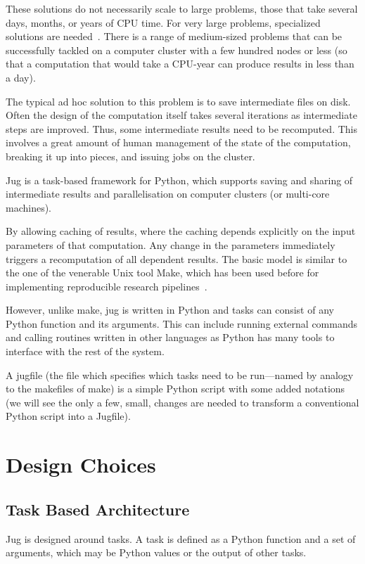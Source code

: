 \documentclass{article}
\begin{document}
These solutions do not necessarily scale to large problems, those that take
several days, months, or years of CPU time. For very large problems,
specialized solutions are needed~\citep{mapReduce}. There is a range of
medium-sized problems that can be successfully tackled on a computer cluster
with a few hundred nodes or less (so that a computation that would take a
CPU-year can produce results in less than a day).

The typical ad hoc solution to this problem is to save intermediate files on
disk. Often the design of the computation itself takes several iterations as
intermediate steps are improved. Thus, some intermediate results need to be
recomputed. This involves a great amount of human management of the state of
the computation, breaking it up into pieces, and issuing jobs on the cluster.

Jug is a task-based framework for Python, which supports saving and sharing of
intermediate results and parallelisation on computer clusters (or multi-core
machines).

By allowing caching of results, where the caching depends explicitly on the
input parameters of that computation. Any change in the parameters immediately
triggers a recomputation of all dependent results. The basic model is similar
to the one of the venerable Unix tool Make, which has been used before for
implementing reproducible research pipelines~\citep{Schwab00makingscientific}.

However, unlike make, jug is written in Python and tasks can consist of any
Python function and its arguments. This can include running external commands
and calling routines written in other languages as Python has many tools to
interface with the rest of the system.

A jugfile (the file which specifies which tasks need to be run---named by
analogy to the makefiles of make) is a simple Python script with some added
notations (we will see the only a few, small, changes are needed to transform a
conventional Python script into a Jugfile).

\section{Design Choices}
\subsection{Task Based Architecture}

Jug is designed around tasks. A task is defined as a Python function and a set
of arguments, which may be Python values or the output of other tasks.
\end{document}
